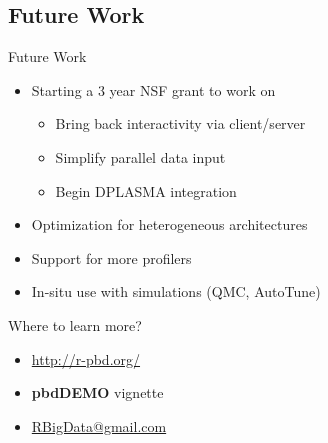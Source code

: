 \subsection{Future Work}

\begin{frame}
  \begin{block}{Future Work}
  \begin{itemize}
    \item Starting a 3 year NSF grant to work on
      \begin{itemize}
      \item Bring back interactivity via client/server
      \item Simplify parallel data input
      \item Begin DPLASMA integration
      \end{itemize}
    \item Optimization for heterogeneous architectures
    \item Support for more profilers
    \item In-situ use with simulations (QMC, AutoTune)
  \end{itemize}
  \end{block}
\end{frame}

\begin{frame}
  \begin{block}{Where to learn more?}
  \begin{itemize}
    \item \url{http://r-pbd.org/}
    \item \textbf{pbdDEMO} vignette
    \item \url{RBigData@gmail.com}
  \end{itemize}
  \end{block}
\end{frame}

